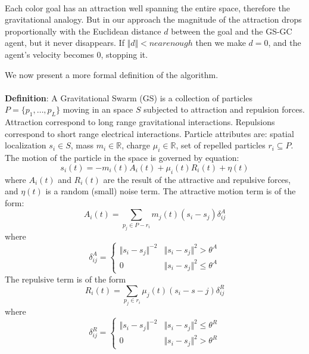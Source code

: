 \paragraph*{} Each color goal has an attraction well spanning the entire space, therefore the gravitational analogy. But in our approach the magnitude of the attraction drops proportionally with the Euclidean distance $d$ between the goal and the GS-GC agent, but it never disappears. If $\Vert d \Vert < nearenough$ then we make $d = 0$, and the agent's velocity becomes 0, stopping it.

We now present a more formal definition of the algorithm.
\paragraph*{} \textbf{Definition}: A Gravitational Swarm (GS) is a collection of particles $P = \lbrace p_1, \ldots , p_L \rbrace$ moving in an space $S$ subjected to attraction and repulsion forces. Attraction correspond to long range gravitational interactions. Repulsions correspond to short range electrical interactions. Particle attributes are: spatial localization $s_i \in S$, mass $m_i \in \mathbb{R}$, charge $\mu_i \in \mathbb{R}$, set of repelled particles $r_i \subseteq P$. The motion of the particle in the space is governed by equation:
\begin{equation}
s_i \left( t \right) = -m_i \left( t \right) A_i \left( t \right) + \mu_i \left( t \right) R_i \left( t \right) + \eta \left( t \right)
\end{equation}
where $A_i(t)$ and $R_i(t)$ are the result of the attractive and repulsive forces, and $\eta(t)$ is a random (small) noise term. The attractive motion term is of the form:
\begin{equation}
A_i(t) = \sum \limits_{p_j \in P - r_i} m_j(t)(s_i - s_j) \delta_{ij}^A
\end{equation}
where
\begin{equation}
\delta_{ij}^A = \begin{cases} 
\Vert s_i - s_j \Vert ^{-2} & \Vert s_i - s_j \Vert ^2 > \theta^A \\
0 & \Vert s_i - s_j \Vert ^2 \leq \theta^A 
\end{cases}
\end{equation}
The repulsive term is of the form
\begin{equation}
R_i(t) = \sum \limits_{p_j \in r_i} \mu_j(t)(s_i - s-j) \delta_{ij}^R
\end{equation}
where
\begin{equation}
\delta_{ij}^R = \begin{cases} 
\Vert s_i - s_j \Vert ^{-2} & \Vert s_i - s_j \Vert ^2 \leq \theta^R \\
0 & \Vert s_i - s_j \Vert ^2 > \theta^R 
\end{cases}
\end{equation}
